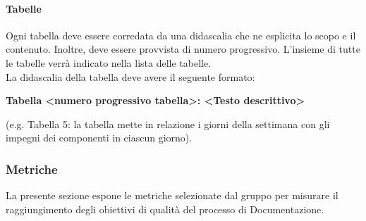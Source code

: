             \paragraph{Tabelle}
                Ogni tabella deve essere corredata da una didascalia che ne esplicita lo scopo e il contenuto. Inoltre, deve essere provvista di numero progressivo. L’insieme di tutte le tabelle verrà indicato nella lista delle tabelle. \\
                La didascalia della tabella deve avere il seguente formato: \\
                \begin{center}
                    \textbf{Tabella <numero progressivo tabella>: <Testo descrittivo>}
                \end{center}
                (e.g. Tabella 5: la tabella mette in relazione i giorni della settimana con gli impegni dei componenti in ciascun giorno).

        \subsubsection{Metriche}
            La presente sezione espone le metriche selezionate dal gruppo per misurare il raggiungimento degli obiettivi di qualità del processo di Documentazione. \\
